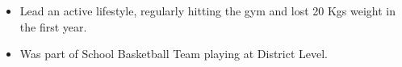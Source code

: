 {\fontsize{11pt}{1em}\bodyfontlight\upshape\color{text}
  \begin{itemize}
  \item Lead an active lifestyle, regularly hitting the gym and lost 20 Kgs weight in the first year. 
  \item Was part of School Basketball Team playing at District Level.
  \end{itemize}
}



